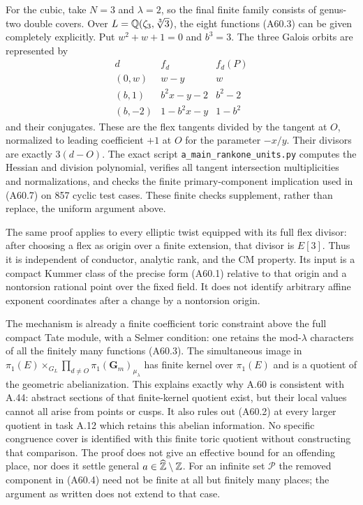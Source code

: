 For the cubic, take $N=3$ and $\lambda=2$, so the final finite
family consists of genus-two double covers. Over
$L=\mathbb Q(\zeta_3,\sqrt[3]{3})$, the eight functions (A60.3) can be
given completely explicitly. Put $w^2+w+1=0$ and $b^3=3$. The
three Galois orbits are represented by
\[
 \begin{array}{c|c|c}
 d& f_d&f_d(P)\\\hline
 (0,w)&w-y&w\\
 (b,1)&b^2x-y-2&b^2-2\\
 (b,-2)&1-b^2x-y&1-b^2
 \end{array}
 \tag{A60.10}
\]
and their conjugates. These are the flex tangents divided by the
tangent at $O$, normalized to leading coefficient $+1$ at $O$
for the parameter $-x/y$. Their divisors are exactly $3(d-O)$.
The exact script \texttt{a\_main\_rankone\_units.py} computes the
Hessian and division polynomial, verifies all tangent
intersection multiplicities and normalizations, and checks the
finite primary-component implication used in (A60.7) on 857
cyclic test cases. These finite checks supplement, rather than
replace, the uniform argument above.

The same proof applies to every elliptic twist equipped with its
full flex divisor: after choosing a flex as origin over a finite
extension, that divisor is $E[3]$. Thus it is independent of
conductor, analytic rank, and the CM property. Its input is a
compact Kummer class of the precise form (A60.1) relative to that
origin and a nontorsion rational point over the fixed field. It
does not identify arbitrary affine exponent coordinates after a
change by a nontorsion origin.

The mechanism is already a finite coefficient toric constraint
above the full compact Tate module, with a Selmer condition: one
retains the mod-$\lambda$ characters of all the finitely many
functions (A60.3). The simultaneous image in
$\pi_1(E)\times_{G_L}\prod_{d\ne O}\pi_1(\mathbf G_m)_{\mu_\lambda}$
has finite kernel over $\pi_1(E)$ and is a quotient of the geometric
abelianization. This explains exactly why A.60 is consistent with
A.44: abstract sections of that finite-kernel quotient exist, but
their local values cannot all arise from points or cusps. It also
rules out (A60.2) at every larger quotient in task A.12 which
retains this abelian information. No specific congruence cover is
identified with this finite toric quotient without constructing
that comparison. The proof does not give an effective bound for
an offending place, nor does it settle general
$a\in\widehat{\mathbb Z}\setminus\mathbb Z$. For an infinite set $\mathcal P$ the
removed component in (A60.4) need not be finite at all but finitely
many places; the argument as written does not extend to that case.
